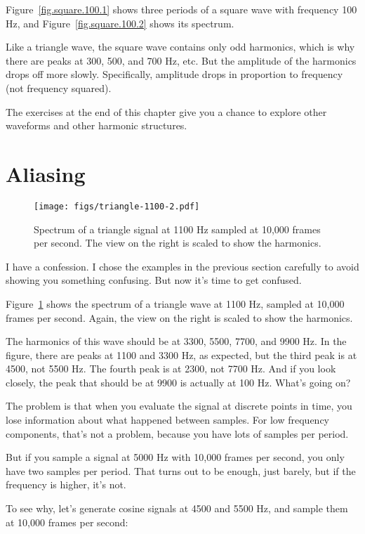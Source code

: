 Figure~\ref{fig.square.100.1} shows three periods of a square
wave with frequency 100 Hz,
and Figure~\ref{fig.square.100.2} shows its spectrum.

Like a triangle wave, the square wave contains only odd harmonics,
which is why there are peaks at 300, 500, and 700 Hz, etc.
But the amplitude of the harmonics drops off more slowly.
Specifically, amplitude drops in proportion to frequency (not frequency
squared).

The exercises at the end of this chapter give you a chance to
explore other waveforms and other harmonic structures.


\section{Aliasing}
\label{aliasing}

\begin{figure}
	\centerline{\texttt{[image: figs/triangle-1100-2.pdf]}}
	\caption{Spectrum of a triangle signal at 1100 Hz sampled at
		10,000 frames per second.  The view on the right is scaled to
		show the harmonics.}
	\label{fig.triangle.1100.2}
\end{figure}

I have a confession.  I chose the examples in the previous section
carefully to avoid showing you something confusing.  But now it's
time to get confused.

Figure~\ref{fig.triangle.1100.2} shows the spectrum of a triangle wave
at 1100 Hz, sampled at 10,000 frames per second.  Again, the view on
the right is scaled to show the harmonics.

The harmonics
of this wave should be at 3300, 5500, 7700, and 9900 Hz.
In the figure, there are peaks at 1100 and 3300 Hz, as expected, but
the third peak is at 4500, not 5500 Hz.  The
fourth peak is at 2300, not 7700 Hz.  And if you look closely, the
peak that should be at 9900 is actually at 100 Hz.  What's going on?

The problem is that when you evaluate the signal at
discrete points in time, you lose information about what happened
between samples.  For low frequency components, that's not a
problem, because you have lots of samples per period.

But if you sample a signal at 5000 Hz with 10,000 frames per second,
you only have two samples per period.  That turns out to be enough,
just barely, but if the frequency is higher, it's not.

To see why, let's generate cosine signals at 4500 and 5500 Hz,
and sample them at 10,000 frames per second:


